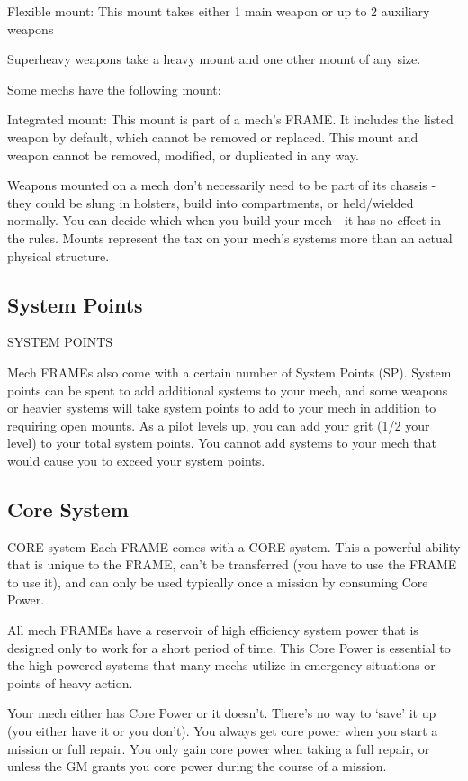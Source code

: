 Flexible mount: This mount takes either 1 main weapon or up to 2 auxiliary weapons
 

Superheavy weapons take a heavy mount and one other mount of any size.
 

Some mechs have the following mount:
 

Integrated mount: This mount is part of a mech’s FRAME. It includes the listed weapon by  
default, which cannot be removed or replaced. This mount and weapon cannot be removed,  
modified, or duplicated in any way. 
 

Weapons mounted on a mech don’t necessarily need to be part of its chassis - they could be  
slung in holsters, build into compartments, or held/wielded normally. You can decide which when  
you build your mech - it has no effect in the rules. Mounts represent the tax on your mech’s  
systems more than an actual physical structure.
 
\subsection{System Points}
                                          SYSTEM POINTS
 

Mech FRAMEs also come with a certain number of System Points (SP). System points can be  
spent to add additional systems to your mech, and some weapons or heavier systems will take  
system points to add to your mech in addition to requiring open mounts. As a pilot levels up, you  
can add your grit (1/2 your level) to your total system points. You cannot add systems to your  
mech that would cause you to exceed your system points.
 
\subsection{Core System}
                                             CORE system   
Each FRAME comes with a CORE system. This a powerful ability that is unique to the FRAME,  
can’t be transferred (you have to use the FRAME to use it), and can only be used typically once a  
mission by consuming Core Power.
 

All mech FRAMEs have a reservoir of high efficiency system power that is designed only to work  
for a short period of time. This Core Power is essential to the high-powered systems that many  
mechs utilize in emergency situations or points of heavy action.
 

Your mech either has Core Power or it doesn’t. There’s no way to ‘save’ it up (you either have it  
or you don’t). You always get core power when you start a mission or full repair. You only gain  
core power when taking a full repair, or unless the GM grants you core power during the course  
of a mission.
 
